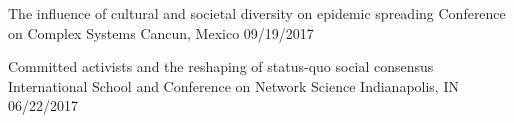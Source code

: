 \begin{cventries}
  \cvpresentation
    {The influence of cultural and societal diversity on epidemic spreading} %
    {Conference on Complex Systems} %
    {Cancun, Mexico} %
    {09/19/2017} %
\vspace{-1.mm}
    
    

    
  \cvpresentation
    {Committed activists and the reshaping of status-quo social consensus} %
    {International School and Conference on Network Science} %
    {Indianapolis, IN} %
    {06/22/2017} %
 \vspace{-1.mm}
 

\end{cventries}

